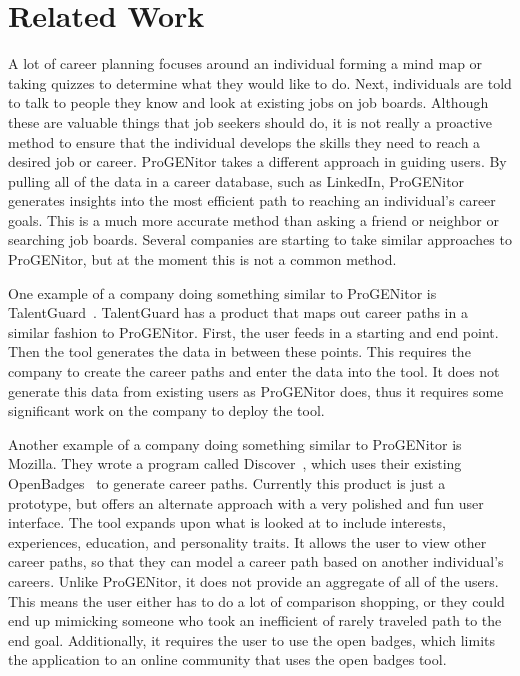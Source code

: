 \section{Related Work}
\label{sect:related-work}
A lot of career planning focuses around an individual forming a mind map or
taking quizzes to determine what they would like to do.  Next, individuals
are told to talk to people they know and look at existing jobs on job boards. 
Although these are valuable things that job seekers should do, it is not really
a proactive method to ensure that the individual develops the skills they need
to reach a desired job or career.  ProGENitor takes a different approach in
guiding users.  By pulling all of the data in a career database, such as
LinkedIn, ProGENitor generates insights into the most efficient path to
reaching an individual's career goals.  This is a much more accurate method than
asking a friend or neighbor or searching job boards.  Several companies are starting to take
similar approaches to ProGENitor, but at the moment this is not a common method.

One example of a company doing something similar to ProGENitor is
TalentGuard~\cite{talentguard}.  TalentGuard has a product that maps out career
paths in a similar fashion to ProGENitor.  First, the user feeds in a starting
and end point.  Then the tool generates the data in between these points.  This
requires the company to create the career paths and enter the data into the
tool.  It does not generate this data from existing users as ProGENitor does,
thus it requires some significant work on the company to deploy the tool.

Another example of a company doing something similar to ProGENitor is Mozilla. 
They wrote a program called Discover~\cite{discover}, which uses their existing
OpenBadges~\cite{openbadges} to generate career paths.  Currently this product
is just a prototype, but offers an alternate approach with a very polished and fun
user interface.  The tool expands upon what is looked at to include interests,
experiences, education, and personality traits.  It allows the user to view
other career paths, so that they can model a career path based on another
individual's careers.  Unlike ProGENitor, it does not provide an aggregate of
all of the users.  This means the user either has to do a lot of comparison
shopping, or they could end up mimicking someone who took an
inefficient of rarely traveled path to the end goal.  Additionally, it requires
the user to use the open badges, which limits the application to an online
community that uses the open badges tool.

